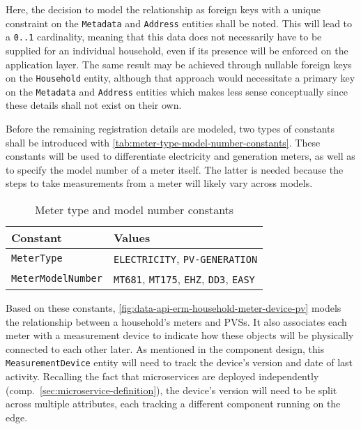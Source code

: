\FloatBarrier

Here, the decision to model the relationship as foreign keys with a unique constraint on the \texttt{Metadata} and \texttt{Address} entities shall be noted. This will lead to a \texttt{0..1} cardinality, meaning that this data does not necessarily have to be supplied for an individual household, even if its presence will be enforced on the application layer. The same result may be achieved through nullable foreign keys on the \texttt{Household} entity, although that approach would necessitate a primary key on the \texttt{Metadata} and \texttt{Address} entities which makes less sense conceptually since these details shall not exist on their own.

\newpage

Before the remaining registration details are modeled, two types of constants shall be introduced with \autoref{tab:meter-type-model-number-constants}. These constants will be used to differentiate electricity and generation meters, as well as to specify the model number of a meter itself. The latter is needed because the steps to take measurements from a meter will likely vary across models.

\begin{table}[hbt]
	\centering
  	\begin{tabularx}{\textwidth}{|l|X|}
		\hline
		\textbf{Constant} & \textbf{Values} \\
	    \hline
	    \texttt{MeterType} & \texttt{ELECTRICITY}, \texttt{PV-GENERATION} \\
		\texttt{MeterModelNumber} & \texttt{MT681}, \texttt{MT175}, \texttt{EHZ}, \texttt{DD3}, \texttt{EASY} \\
	    	\hline
	\end{tabularx}
  	\caption{Meter type and model number constants}
  	\label{tab:meter-type-model-number-constants}
\end{table}

\FloatBarrier

Based on these constants, \autoref{fig:data-api-erm-household-meter-device-pv} models the relationship between a household's meters and \acsp{PVS}. It also associates each meter with a measurement device to indicate how these objects will be physically connected to each other later. As mentioned in the component design, this \texttt{MeasurementDevice} entity will need to track the device's version and date of last activity. Recalling the fact that microservices are deployed independently (comp.~\autoref{sec:microservice-definition}), the device's version will need to be split across multiple attributes, each tracking a different component running on the edge.

